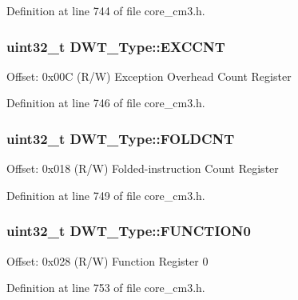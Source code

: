 Definition at line 744 of file core\+\_\+cm3.\+h.

\subsubsection[{\texorpdfstring{E\+X\+C\+C\+NT}{EXCCNT}}]{ uint32\+\_\+t D\+W\+T\+\_\+\+Type\+::\+E\+X\+C\+C\+NT}\hypertarget{structDWT__Type_ac0801a2328f3431e4706fed91c828f82}{}\label{structDWT__Type_ac0801a2328f3431e4706fed91c828f82}
Offset\+: 0x00C (R/W) Exception Overhead Count Register 

Definition at line 746 of file core\+\_\+cm3.\+h.

\subsubsection[{\texorpdfstring{F\+O\+L\+D\+C\+NT}{FOLDCNT}}]{ uint32\+\_\+t D\+W\+T\+\_\+\+Type\+::\+F\+O\+L\+D\+C\+NT}\hypertarget{structDWT__Type_a35f2315f870a574e3e6958face6584ab}{}\label{structDWT__Type_a35f2315f870a574e3e6958face6584ab}
Offset\+: 0x018 (R/W) Folded-\/instruction Count Register 

Definition at line 749 of file core\+\_\+cm3.\+h.

\subsubsection[{\texorpdfstring{F\+U\+N\+C\+T\+I\+O\+N0}{FUNCTION0}}]{ uint32\+\_\+t D\+W\+T\+\_\+\+Type\+::\+F\+U\+N\+C\+T\+I\+O\+N0}\hypertarget{structDWT__Type_a5fbd9947d110cc168941f6acadc4a729}{}\label{structDWT__Type_a5fbd9947d110cc168941f6acadc4a729}
Offset\+: 0x028 (R/W) Function Register 0 

Definition at line 753 of file core\+\_\+cm3.\+h.

